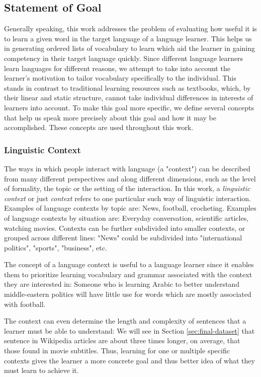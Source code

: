 \subsection{Statement of Goal} \label{sec:statement-of-goal}
Generally speaking, this work addresses the problem of evaluating how useful it is to learn a given word in the target language of a language learner.
This helps us in generating ordered lists of vocabulary to learn which aid the learner in gaining competency in their target language quickly.
Since different language learners learn languages for different reasons, we attempt to take into account the learner's motivation to tailor vocabulary specifically to the individual.
This stands in contrast to traditional learning resources such as textbooks, which, by their linear and static structure, cannot take individual differences in interests of learners into account.
To make this goal more specific, we define several concepts that help us speak more precisely about this goal and how it may be accomplished.
These concepts are used throughout this work.

\subsubsection{Linguistic Context}
The ways in which people interact with language (a "context") can be described from many different perspectives and along different dimensions, such as the level of formality, the topic or the setting of the interaction.
In this work, a \textit{linguistic context} or just \textit{context} refers to one particular such way of linguistic interaction.
Examples of language contexts by topic are:
News, football, crocheting.
Examples of language contexts by situation are:
Everyday conversation, scientific articles, watching movies.
Contexts can be further subdivided into smaller contexts, or grouped across different lines:
"News" could be subdivided into "international politics", "sports", "business", etc.

The concept of a language context is useful to a language learner since it enables them to prioritize learning vocabulary and grammar associated with the context they are interested in:
Someone who is learning Arabic to better understand middle-eastern politics will have little use for words which are mostly associated with football.

The context can even determine the length and complexity of sentences that a learner must be able to understand:
We will see in Section \ref{sec:final-dataset} that sentence in Wikipedia articles are about three times longer, on average, that those found in movie subtitles.
Thus, learning for one or multiple specific contexts gives the learner a more concrete goal and thus better idea of what they must learn to achieve it.

